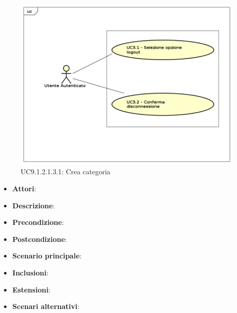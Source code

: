 						\label{UC9.1.2.1.3.1}
						\begin{figure}[h]
							\centering
						\includegraphics[scale=0.7,keepaspectratio]{UML/UC9.png}
							\caption{UC9.1.2.1.3.1: Crea categoria}
						\end{figure}
						\FloatBarrier
						\begin{itemize}
							\item \textbf{Attori}: 
							\item \textbf{Descrizione}: 
							\item \textbf{Precondizione}: 
							\item \textbf{Postcondizione}: 
							\item \textbf{Scenario principale}:
							\item \textbf{Inclusioni}:
							\item \textbf{Estensioni}:
							\item \textbf{Scenari alternativi}:
						\end{itemize}
						

